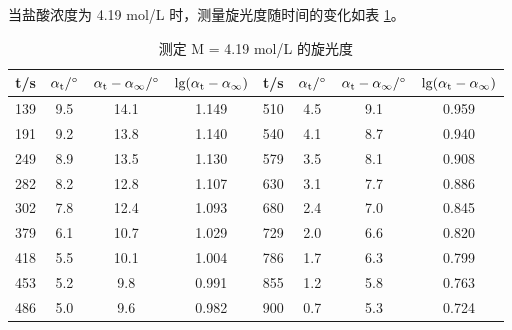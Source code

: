 \documentclass[cn,hazy,pku,12pt,normal,math=newtx,cite=super]{elegantnote}
\begin{document}
当盐酸浓度为 4.19 mol/L 时，测量旋光度随时间的变化如表 \ref{6}。
\begin{table}[h]
    \centering
    \caption{测定 M = 4.19 mol/L 的旋光度}
    \label{6}
    \begin{tabular}{cccc|cccc}
    \hline
    t/s & \multicolumn{1}{l}{$\rm \alpha_t / \degree$} & $\rm \alpha_t - \alpha_\infty / \degree$ & \multicolumn{1}{l|}{$\rm lg(\alpha_t-\alpha_\infty)$} & t/s & \multicolumn{1}{l}{$\rm \alpha_t / \degree$} & $\rm \alpha_t - \alpha_\infty / \degree$ & \multicolumn{1}{l}{$\rm lg(\alpha_t-\alpha_\infty)$} \\ \hline
    139 & 9.5 & 14.1 & 1.149 & 510 & 4.5 & 9.1& 0.959 \\
    191 & 9.2 & 13.8 & 1.140 & 540 & 4.1 & 8.7& 0.940 \\
    249 & 8.9 & 13.5 & 1.130 & 579 & 3.5 & 8.1& 0.908 \\
    282 & 8.2 & 12.8 & 1.107 & 630 & 3.1 & 7.7& 0.886 \\
    302 & 7.8 & 12.4 & 1.093 & 680 & 2.4 & 7.0& 0.845 \\
    379 & 6.1 & 10.7 & 1.029 & 729 & 2.0 & 6.6& 0.820 \\
    418 & 5.5 & 10.1 & 1.004 & 786 & 1.7 & 6.3& 0.799 \\
    453 & 5.2 & 9.8  & 0.991 & 855 & 1.2 & 5.8& 0.763 \\
    486 & 5.0 & 9.6  & 0.982 & 900 & 0.7 & 5.3& 0.724 \\ \hline
    \end{tabular}
\end{table}
\end{document}
